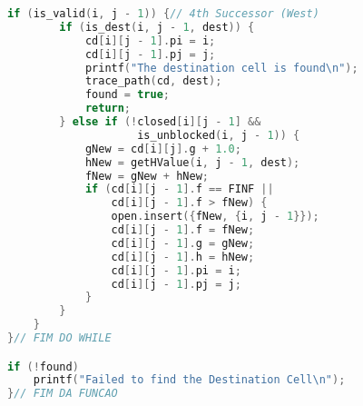 \newpage

\begin{lstlisting}[language=C++, title=Parte 2: A* (Parte V)]
	if (is_valid(i, j - 1)) {// 4th Successor (West)
		if (is_dest(i, j - 1, dest)) {
			cd[i][j - 1].pi = i;
			cd[i][j - 1].pj = j;
			printf("The destination cell is found\n");
			trace_path(cd, dest);
			found = true;
			return;
		} else if (!closed[i][j - 1] && 
		            is_unblocked(i, j - 1)) {
			gNew = cd[i][j].g + 1.0;
			hNew = getHValue(i, j - 1, dest);
			fNew = gNew + hNew;
			if (cd[i][j - 1].f == FINF || 
			    cd[i][j - 1].f > fNew) {
				open.insert({fNew, {i, j - 1}});
				cd[i][j - 1].f = fNew;
				cd[i][j - 1].g = gNew;
				cd[i][j - 1].h = hNew;
				cd[i][j - 1].pi = i;
				cd[i][j - 1].pj = j;
			}
		}
	}
}// FIM DO WHILE

if (!found)
	printf("Failed to find the Destination Cell\n");
}// FIM DA FUNCAO
\end{lstlisting}